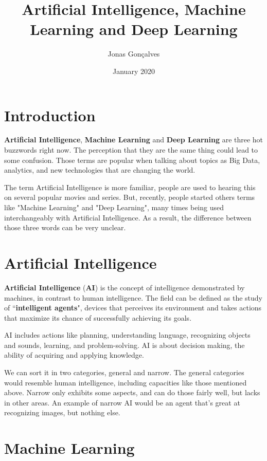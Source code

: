 \documentclass{article}
\title{Artificial Intelligence, Machine Learning and Deep Learning}
\author{Jonas Gonçalves}
\date{January 2020}
\begin{document}
\maketitle

\section{Introduction}
    
    \textbf{Artificial Intelligence}, \textbf{Machine Learning} and \textbf{Deep Learning} are three hot buzzwords right now. The perception that they are the same thing could lead to some confusion. Those terms are popular when talking about topics as Big Data, analytics, and new technologies that are changing the world.
    
    The term Artificial Intelligence is more familiar, people are used to hearing this on several popular movies and series. But, recently, people started others terms like "Machine Learning" and "Deep Learning", many times being used interchangeably with Artificial Intelligence. As a result, the difference between those three words can be very unclear.
    
\section{Artificial Intelligence}

    \textbf{Artificial Intelligence} (\textbf{AI}) is the concept of intelligence demonstrated by machines, in contrast to human intelligence. The field can be defined as the study of ``\textbf{intelligent agents}", devices that perceives its environment and takes actions that maximize its chance of successfully achieving its goals.
    
    AI includes actions like planning, understanding language, recognizing objects and sounds, learning, and problem-solving. AI is about decision making, the ability of acquiring and applying knowledge.
    
    We can sort it in two categories, general and narrow. The general categories would resemble human intelligence, including capacities like those mentioned above. Narrow only exhibits some aspects, and can do those fairly well, but lacks in other areas. An example of narrow AI would be an agent that’s great at recognizing images, but nothing else.
    
\section{Machine Learning}
\end{document}
